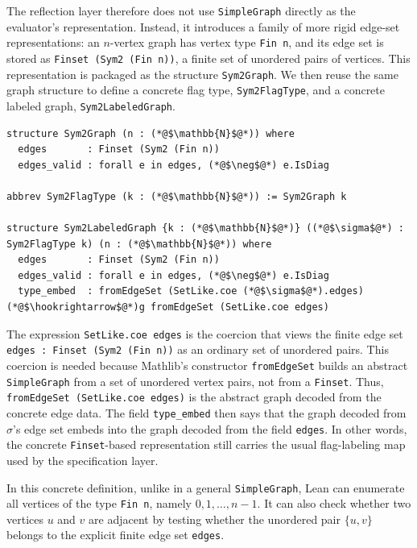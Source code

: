 \documentclass{article}
\newcommand{\lean}[1]{\texttt{#1}}
\begin{document}
The reflection layer therefore does not use \lean{SimpleGraph} directly as the
evaluator's representation.  Instead, it introduces a family of more rigid
edge-set representations: an \(n\)-vertex graph has vertex type \lean{Fin n},
and its edge set is stored as \lean{Finset (Sym2 (Fin n))}, a finite set of
unordered pairs of vertices.  This representation is packaged as the structure
\lean{Sym2Graph}.  We then reuse the same graph structure to define a
concrete flag type, \lean{Sym2FlagType}, and a concrete labeled graph,
\lean{Sym2LabeledGraph}.
\begin{lstlisting}
structure Sym2Graph (n : (*@$\mathbb{N}$@*)) where
  edges       : Finset (Sym2 (Fin n))
  edges_valid : forall e in edges, (*@$\neg$@*) e.IsDiag

abbrev Sym2FlagType (k : (*@$\mathbb{N}$@*)) := Sym2Graph k

structure Sym2LabeledGraph {k : (*@$\mathbb{N}$@*)} ((*@$\sigma$@*) : Sym2FlagType k) (n : (*@$\mathbb{N}$@*)) where
  edges       : Finset (Sym2 (Fin n))
  edges_valid : forall e in edges, (*@$\neg$@*) e.IsDiag
  type_embed  : fromEdgeSet (SetLike.coe (*@$\sigma$@*).edges) (*@$\hookrightarrow$@*)g fromEdgeSet (SetLike.coe edges)
\end{lstlisting}
The expression \lean{SetLike.coe edges} is the coercion that views the
finite edge set \lean{edges : Finset (Sym2 (Fin n))} as an ordinary set of
unordered pairs.  This coercion is needed because Mathlib's constructor
\lean{fromEdgeSet} builds an abstract \lean{SimpleGraph} from a set of
unordered vertex pairs, not from a \lean{Finset}.  Thus,
\lean{fromEdgeSet (SetLike.coe edges)} is the abstract graph decoded from the
concrete edge data.  The field \lean{type\_embed} then says that the graph
decoded from \(\sigma\)'s edge set embeds into the graph decoded from the field
\lean{edges}.  In other words, the concrete
\lean{Finset}-based representation still carries the usual flag-labeling map
used by the specification layer.

In this concrete definition, unlike in a general \lean{SimpleGraph}, Lean can
enumerate all vertices of the type \lean{Fin n}, namely \(0,1,\ldots,n-1\).
It can also check whether two vertices \(u\) and \(v\) are adjacent by testing
whether the unordered pair \(\{u,v\}\) belongs to the explicit finite edge set
\lean{edges}.
\end{document}
